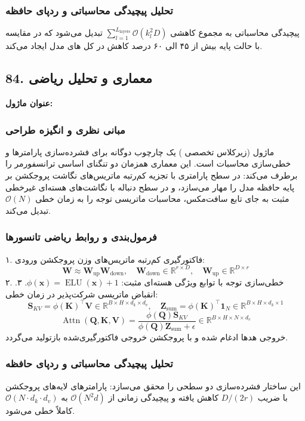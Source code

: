 \subsubsection*{تحلیل پیچیدگی محاسباتی و ردپای حافظه}
پیچیدگی محاسباتی به مجموع کاهشی $\sum_{l=1}^{L_{\text{layers}}} \mathcal{O}(k_l^2 D)$ تبدیل می‌شود که در مقایسه با حالت پایه بیش از ۴۵ الی ۶۰ درصد کاهش در کل های مدل ایجاد می‌کند.


\subsection*{84. معماری و تحلیل ریاضی }
\textbf{عنوان ماژول:} 

\subsubsection*{مبانی نظری و انگیزه طراحی}
ماژول  (زیرکلاس تخصصی ) یک چارچوب دوگانه برای فشرده‌سازی پارامترها و خطی‌سازی محاسبات است. این معماری همزمان دو تنگنای اساسی ترانسفورمر را برطرف می‌کند: در سطح پارامتری با تجزیه کم‌رتبه ماتریس‌های نگاشت پروجکشن بر پایه  حافظه مدل را مهار می‌سازد، و در سطح دنباله با نگاشت‌های هسته‌ای غیرخطی مثبت به جای تابع سافت‌مکس، محاسبات ماتریسی توجه را به زمان خطی $\mathcal{O}(N)$ تبدیل می‌کند.

\subsubsection*{فرمول‌بندی و روابط ریاضی تانسورها}
۱. فاکتورگیری کم‌رتبه ماتریس‌های وزن پروجکشن ورودی:
\begin{equation}
\mathbf{W} \approx \mathbf{W}_{\text{up}} \mathbf{W}_{\text{down}}, \quad \mathbf{W}_{\text{down}} \in \mathbb{R}^{r \times D}, \quad \mathbf{W}_{\text{up}} \in \mathbb{R}^{D \times r}
\end{equation}
۲. خطی‌سازی توجه با توابع ویژگی هسته‌ای مثبت: $\phi(\mathbf{x}) = \operatorname{ELU}(\mathbf{x}) + 1$.
۳. انقباض ماتریسی شرکت‌پذیر در زمان خطی:
\begin{equation}
\mathbf{S}_{KV} = \phi(\mathbf{K})^\top \mathbf{V} \in \mathbb{R}^{B \times H \times d_k \times d_v}, \quad \mathbf{Z}_{\text{sum}} = \phi(\mathbf{K})^\top \mathbf{1}_N \in \mathbb{R}^{B \times H \times d_k \times 1}
\end{equation}
\begin{equation}
\operatorname{Attn}(\mathbf{Q}, \mathbf{K}, \mathbf{V}) = \frac{\phi(\mathbf{Q}) \mathbf{S}_{KV}}{\phi(\mathbf{Q}) \mathbf{Z}_{\text{sum}} + \epsilon} \in \mathbb{R}^{B \times H \times N \times d_v}
\end{equation}
خروجی هدها ادغام شده و با پروجکشن خروجی فاکتورگیری‌شده بازتولید می‌گردد.

\subsubsection*{تحلیل پیچیدگی محاسباتی و ردپای حافظه}
این ساختار فشرده‌سازی دو سطحی را محقق می‌سازد: پارامترهای لایه‌های پروجکشن با ضریب $D / (2r)$ کاهش یافته و پیچیدگی زمانی از $\mathcal{O}(N^2 d)$ به $\mathcal{O}(N \cdot d_k \cdot d_v)$ کاملاً خطی می‌شود.
